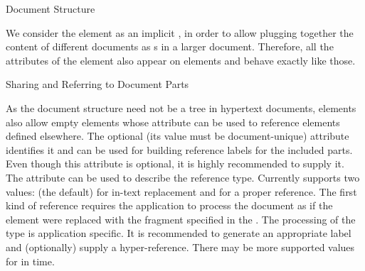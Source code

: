 \begin{omgroup}[id=omdoc-infrastructure,short=Document Infrastructure]
\begin{omgroup}[id=sectioning]{Document Structure}
\begin{module}[id=sectioning]
We consider the  element as an implicit , in order to
allow plugging together the content of different \omdoc documents as
{s} in a larger document. Therefore, all the attributes of the
 element also appear on  elements and behave exactly
like those.
\end{module}
\end{omgroup}

\begin{module}[id=sharing]
\begin{omgroup}[id=sharing,short=Sharing Document Parts] 
{Sharing and Referring to Document Parts}

\begin{definition}[id=ref.def]
  As the document structure need not be a tree in hypertext documents, 
  elements also allow empty {} elements whose  attribute
  can be used to reference \omdoc elements defined elsewhere. The optional
   (its value must be document-unique) attribute
  identifies it and can be used for building reference labels for the included parts. Even
  though this attribute is optional, it is highly recommended to supply it.  The
   attribute can be used to describe the reference type.  Currently
  \omdoc supports two values:  (the default) for in-text
  replacement and  for a proper reference. The first kind of
  reference requires the \omdoc application to process the document as if the
   element were replaced with the \omdoc fragment specified in the
  . The processing of the type  is
  application specific. It is recommended to generate an appropriate label and
  (optionally) supply a hyper-reference.  There may be more supported values for
   in time.
\end{definition}


\end{omgroup}
\end{module}
\end{omgroup}
